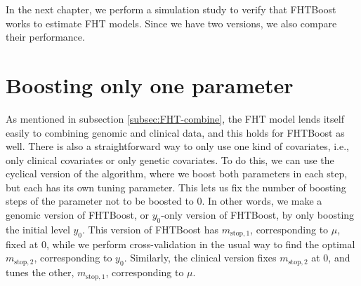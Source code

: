 In the next chapter, we perform a simulation study to verify that FHTBoost works to estimate FHT models.
Since we have two versions, we also compare their performance.

\section{Boosting only one parameter}
As mentioned in subsection \ref{subsec:FHT-combine}, the FHT model lends itself easily to combining genomic and clinical data, and this holds for FHTBoost as well.
There is also a straightforward way to only use one kind of covariates, i.e., only clinical covariates or only genetic covariates.
To do this, we can use the cyclical version of the algorithm, where we boost both parameters in each step, but each has its own tuning parameter.
This lets us fix the number of boosting steps of the parameter not to be boosted to 0.
In other words, we make a genomic version of FHTBoost, or $y_0$-only version of FHTBoost, by only boosting the initial level $y_0$.
This version of FHTBoost has $m_{\text{stop},1}$, corresponding to $\mu$, fixed at 0, while we perform cross-validation in the usual way to find the optimal $m_{\text{stop},2}$, corresponding to $y_0$.
Similarly, the clinical version fixes $m_{\text{stop},2}$ at 0, and tunes the other, $m_{\text{stop},1}$, corresponding to $\mu$.